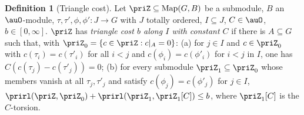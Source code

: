 \documentclass[10pt]{amsart}
\theoremstyle{definition}
\newtheorem{definition}[theorem]{Definition}
\theoremstyle{remark}
\begin{document}
\begin{definition}[Triangle cost]\label{pri:def-cost}
Let $\priZ\subseteq\operatorname{Map}(G,B)$ be a submodule, $B$ an $\auO$-module, $\tau,\tau',
\phi,\phi'\colon J\to G$ with $J$ totally ordered, $I\subseteq J$, $C\in\auO$, $b\in[0,\infty]$.
$\priZ$ has \emph{triangle cost $b$ along $I$ with constant $C$} if there is $A\subseteq G$ such
that, with $\priZ_0=\{c\in\priZ:c|_A=0\}$: (a) for $j\in I$ and $c\in\priZ_0$ with $c(\tau_i)=
c(\tau'_i)$ for all $i<j$ and $c(\phi_i)=c(\phi'_i)$ for $i<j$ in $I$, one has $C(c(\tau_j)-
c(\tau'_j))=0$; (b) for every submodule $\priZ_1\subseteq\priZ_0$ whose members vanish at all
$\tau_j,\tau'_j$ and satisfy $c(\phi_j)=c(\phi'_j)$ for $j\in I$, $\prirl(\priZ,\priZ_0)+\prirl(
\priZ_1,\priZ_1[C])\le b$, where $\priZ_1[C]$ is the $C$-torsion.
\end{definition}
\end{document}
